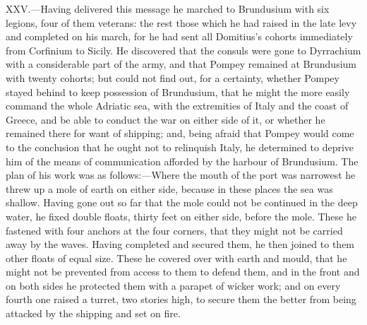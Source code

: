 XXV.—Having delivered this message he marched to Brundusium with six
legions, four of them veterans: the rest those which he had raised in
the late levy and completed on his march, for he had sent all Domitius's
cohorts immediately from Corfinium to Sicily. He discovered that the
consuls were gone to Dyrrachium with a considerable part of the army,
and that Pompey remained at Brundusium with twenty cohorts; but could
not find out, for a certainty, whether Pompey stayed behind to keep
possession of Brundusium, that he might the more easily command the
whole Adriatic sea, with the extremities of Italy and the coast of
Greece, and be able to conduct the war on either side of it, or whether
he remained there for want of shipping; and, being afraid that Pompey
would come to the conclusion that he ought not to relinquish Italy, he
determined to deprive him of the means of communication afforded by the
harbour of Brundusium. The plan of his work was as follows:—Where the
mouth of the port was narrowest he threw up a mole of earth on either
side, because in these places the sea was shallow. Having gone out so
far that the mole could not be continued in the deep water, he fixed
double floats, thirty feet on either side, before the mole. These he
fastened with four anchors at the four corners, that they might not be
carried away by the waves. Having completed and secured them, he then
joined to them other floats of equal size. These he covered over with
earth and mould, that he might not be prevented from access to them to
defend them, and in the front and on both sides he protected them with a
parapet of wicker work; and on every fourth one raised a turret, two
stories high, to secure them the better from being attacked by the
shipping and set on fire.

